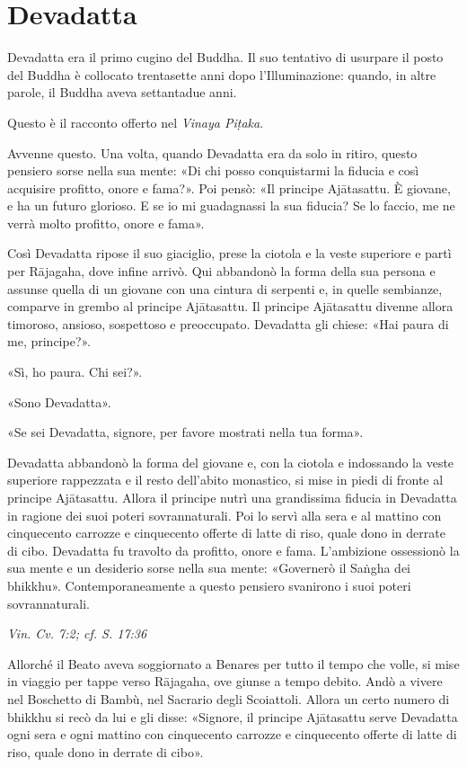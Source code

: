 \chapter{Devadatta}

 Devadatta era il primo cugino del Buddha. Il suo
tentativo di usurpare il posto del Buddha è collocato trentasette anni
dopo l’Illuminazione: quando, in altre parole, il Buddha aveva
settantadue anni.


 Questo è il racconto offerto nel \emph{Vinaya Piṭaka}.


 Avvenne questo. Una volta, quando Devadatta era da solo in
ritiro, questo pensiero sorse nella sua mente: «Di chi posso
conquistarmi la fiducia e così acquisire profitto, onore e fama?». Poi
pensò: «Il principe Ajātasattu. È giovane, e ha un futuro glorioso. E se
io mi guadagnassi la sua fiducia? Se lo faccio, me ne verrà molto
profitto, onore e fama».


Così Devadatta ripose il suo giaciglio, prese la ciotola e la veste
superiore e partì per Rājagaha, dove infine arrivò. Qui abbandonò la
forma della sua persona e assunse quella di un giovane con una cintura
di serpenti e, in quelle sembianze, comparve in grembo al principe
Ajātasattu. Il principe Ajātasattu divenne allora timoroso, ansioso,
sospettoso e preoccupato. Devadatta gli chiese: «Hai paura di me,
principe?».


«Sì, ho paura. Chi sei?».


«Sono Devadatta».


«Se sei Devadatta, signore, per favore mostrati nella tua forma».


Devadatta abbandonò la forma del giovane e, con la ciotola e indossando
la veste superiore rappezzata e il resto dell’abito monastico, si mise
in piedi di fronte al principe Ajātasattu. Allora il principe nutrì una
grandissima fiducia in Devadatta in ragione dei suoi poteri
sovrannaturali. Poi lo servì alla sera e al mattino con cinquecento
carrozze e cinquecento offerte di latte di riso, quale dono in derrate
di cibo. Devadatta fu travolto da profitto, onore e fama. L’ambizione
ossessionò la sua mente e un desiderio sorse nella sua mente: «Governerò
il Saṅgha dei bhikkhu». Contemporaneamente a questo pensiero svanirono i
suoi poteri sovrannaturali.


\emph{Vin. Cv. 7:2; cf. S. 17:36}


Allorché il Beato aveva soggiornato a Benares per tutto il tempo che
volle, si mise in viaggio per tappe verso Rājagaha, ove giunse a tempo
debito. Andò a vivere nel Boschetto di Bambù, nel Sacrario degli
Scoiattoli. Allora un certo numero di bhikkhu si recò da lui e gli
disse: «Signore, il principe Ajātasattu serve Devadatta ogni sera e ogni
mattino con cinquecento carrozze e cinquecento offerte di latte di riso,
quale dono in derrate di cibo».


